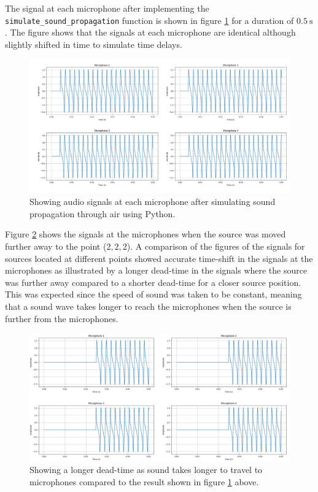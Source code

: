 \documentclass[a4paper,11pt]{article}
\begin{document}
The signal at each microphone after implementing the \texttt{simulate\_sound\_propagation} function is shown in figure \ref{fig:signals} for a duration of $\SI{0.5}{\second}$. The figure shows that the signals at each microphone are identical although slightly shifted in time to simulate time delays.
\begin{figure}[ht!]
	\centering
	\includegraphics[width=1.1\linewidth]{mic_signals.png}
	\caption{Showing audio signals at each microphone after simulating sound propagation through air using Python.}
	\label{fig:signals}
\end{figure}
Figure \ref{fig:signals_2} shows the signals at the microphones when the source was moved further away to the point ($2,2,2$). A comparison of the figures of the signals for sources located at different points showed accurate time-shift in the signals at the microphones as illustrated by a longer dead-time in the signals where the source was further away compared to a shorter dead-time for a closer source position. This was expected since the speed of sound was taken to be constant, meaning that a sound wave takes longer to reach the microphones when the source is further from the microphones.
\begin{figure}[ht!]
	\centering
	\includegraphics[width=1.1\linewidth]{mic_signals_2.png}
	\caption{Showing a longer dead-time as sound takes longer to travel to microphones compared to the result shown in figure \ref{fig:signals} above.}
	\label{fig:signals_2}
\end{figure}
\end{document}
